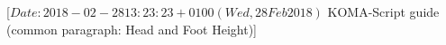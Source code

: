 %
%
%
%
%
%
%
%
% 
%
%
%
%

                 [$Date: 2018-02-28 13:23:23 +0100 (Wed, 28 Feb 2018) $
                  KOMA-Script guide (common paragraph: Head and Foot Height)]


